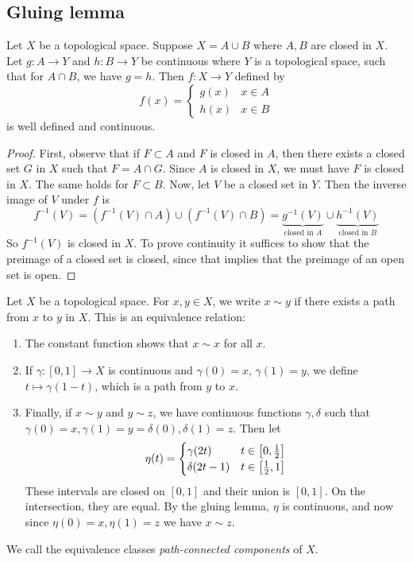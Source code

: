 \subsection{Gluing lemma}
\begin{lemma}
	Let \( X \) be a topological space.
	Suppose \( X = A \cup B \) where \( A, B \) are closed in \( X \).
	Let \( g \colon A \to Y \) and \( h \colon B \to Y \) be continuous where \( Y \) is a topological space, such that for \( A \cap B \), we have \( g = h \).
	Then \( f \colon X \to Y \) defined by
	\[
		f(x) = \begin{cases}
			g(x) & x \in A \\
			h(x) & x \in B
		\end{cases}
	\]
	is well defined and continuous.
\end{lemma}
\begin{proof}
	First, observe that if \( F \subset A \) and \( F \) is closed in \( A \), then there exists a closed set \( G \) in \( X \) such that \( F = A \cap G \).
	Since \( A \) is closed in \( X \), we must have \( F \) is closed in \( X \).
	The same holds for \( F \subset B \).
	Now, let \( V \) be a closed set in \( Y \).
	Then the inverse image of \( V \) under \( f \) is
	\[
		f^{-1}(V) = (f^{-1}(V) \cap A) \cup (f^{-1}(V) \cap B) = \underbrace{g^{-1}(V)}_{\text{closed in } A} \cup \underbrace{h^{-1}(V)}_{\text{closed in } B}
	\]
	So \( f^{-1}(V) \) is closed in \( X \).
	To prove continuity it suffices to show that the preimage of a closed set is closed, since that implies that the preimage of an open set is open.
\end{proof}
\begin{definition}
	Let \( X \) be a topological space.
	For \( x, y \in X \), we write \( x \sim y \) if there exists a path from \( x \) to \( y \) in \( X \).
	This is an equivalence relation:
	\begin{enumerate}
		\item The constant function shows that \( x \sim x \) for all \( x \).
		\item If \( \gamma \colon [0,1] \to X \) is continuous and \( \gamma(0) = x \), \( \gamma(1) = y \), we define \( t \mapsto \gamma(1-t) \), which is a path from \( y \) to \( x \).
		\item Finally, if \( x \sim y \) and \( y \sim z \), we have continuous functions \( \gamma, \delta \) such that \( \gamma(0) = x, \gamma(1) = y = \delta(0), \delta(1) = z \).
		      Then let
		      \[
			      \eta(t) = \begin{cases}
				      \gamma(2t)   & t \in \qty[0, \frac{1}{2}] \\
				      \delta(2t-1) & t \in \qty[\frac{1}{2}, 1]
			      \end{cases}
		      \]
		      These intervals are closed on \( [0,1] \) and their union is \( [0,1] \).
		      On the intersection, they are equal.
		      By the gluing lemma, \( \eta \) is continuous, and now since \( \eta(0) = x, \eta(1) = z \) we have \( x \sim z \).
	\end{enumerate}
	We call the equivalence classes \textit{path-connected components} of \( X \).
\end{definition}
